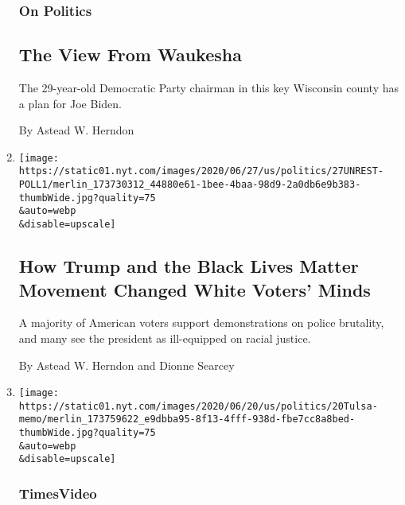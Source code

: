 \begin{enumerate}
  \hypertarget{on-politics}{%
  \subsubsection{On Politics}\label{on-politics}}

  \hypertarget{the-view-from-waukesha}{%
  \subsection{The View From Waukesha}\label{the-view-from-waukesha}}

  The 29-year-old Democratic Party chairman in this key Wisconsin county
  has a plan for Joe Biden.

  By Astead W. Herndon
\item
  \href{/2020/06/27/us/politics/trump-biden-protests-polling.html}{}

  \texttt{[image: https://static01.nyt.com/images/2020/06/27/us/politics/27UNREST-POLL1/merlin\_173730312\_44880e61-1bee-4baa-98d9-2a0db6e9b383-thumbWide.jpg?quality=75\\\&auto=webp\\\&disable=upscale]}

  \hypertarget{how-trump-and-the-black-lives-matter-movement-changed-white-voters-minds}{%
  \subsection{How Trump and the Black Lives Matter Movement Changed
  White Voters'
  Minds}\label{how-trump-and-the-black-lives-matter-movement-changed-white-voters-minds}}

  A majority of American voters support demonstrations on police
  brutality, and many see the president as ill-equipped on racial
  justice.

  By Astead W. Herndon and Dionne Searcey
\item
  \href{/video/us/100000007188759/trump-rally-juneteenth-tulsa-oklahoma.html}{}

  \texttt{[image: https://static01.nyt.com/images/2020/06/20/us/politics/20Tulsa-memo/merlin\_173759622\_e9dbba95-8f13-4fff-938d-fbe7cc8a8bed-thumbWide.jpg?quality=75\\\&auto=webp\\\&disable=upscale]}

  \hypertarget{timesvideo}{%
  \subsubsection{TimesVideo}\label{timesvideo}}

  \hypertarget{why-trumps-tulsa-rally-put-the-citys-black-residents-on-edge}{%
}
\end{enumerate}
